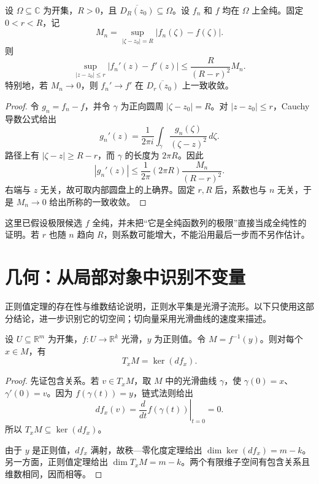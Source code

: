 \documentclass[11pt,a4paper,fontset=fandol,scheme=plain]{ctexart}
\begin{document}
\begin{proposition}[从边界误差到内部导数]\label{thm:cauchy-transfer}

设 $\Omega\subseteq\mathbb C$ 为开集，$R>0$，且 $\overline{D_R(z_0)}\subseteq\Omega$。设 $f_n$ 和 $f$ 均在 $\Omega$ 上全纯。固定 $0<r<R$，记
\[
M_n=\sup_{|\zeta-z_0|=R}|f_n(\zeta)-f(\zeta)|.
\]
则
\[
\sup_{|z-z_0|\le r}|f_n'(z)-f'(z)|
\le \frac{R}{(R-r)^2}M_n.
\]
特别地，若 $M_n\to0$，则 $f_n'\to f'$ 在 $\overline{D_r(z_0)}$ 上一致收敛。

\end{proposition}

\begin{proof}

令 $g_n=f_n-f$，并令 $\gamma$ 为正向圆周 $|\zeta-z_0|=R$。对 $|z-z_0|\le r$，Cauchy 导数公式给出
\[
g_n'(z)=\frac{1}{2\pi i}\int_\gamma
\frac{g_n(\zeta)}{(\zeta-z)^2}\,d\zeta.
\]
路径上有 $|\zeta-z|\ge R-r$，而 $\gamma$ 的长度为 $2\pi R$。因此
\[
|g_n'(z)|\le \frac{1}{2\pi}(2\pi R)
\frac{M_n}{(R-r)^2}.
\]
右端与 $z$ 无关，故可取内部圆盘上的上确界。固定 $r,R$ 后，系数也与 $n$ 无关，于是 $M_n\to0$ 给出所称的一致收敛。
\end{proof}

这里已假设极限候选 $f$ 全纯，并未把“它是全纯函数列的极限”直接当成全纯性的证明。若 $r$ 也随 $n$ 趋向 $R$，则系数可能增大，不能沿用最后一步而不另作估计。

\clearpage
\section{几何：从局部对象中识别不变量}

正则值定理的存在性与维数结论说明，正则水平集是光滑子流形。以下只使用这部分结论，进一步识别它的切空间；切向量采用光滑曲线的速度来描述。

\begin{proposition}[正则水平集的切空间]\label{thm:regular-level-tangent}

设 $U\subseteq\mathbb R^m$ 为开集，$f\colon U\to\mathbb R^k$ 光滑，$y$ 为正则值。令 $M=f^{-1}(y)$。则对每个 $x\in M$，有
\[
T_xM=\ker(df_x).
\]

\end{proposition}

\begin{proof}

先证包含关系。若 $v\in T_xM$，取 $M$ 中的光滑曲线 $\gamma$，使 $\gamma(0)=x$、$\gamma'(0)=v$。因为 $f(\gamma(t))=y$，链式法则给出
\[
df_x(v)=\left.\frac{d}{dt}f(\gamma(t))\right|_{t=0}=0.
\]
所以 $T_xM\subseteq\ker(df_x)$。

由于 $y$ 是正则值，$df_x$ 满射，故秩—零化度定理给出 $\dim\ker(df_x)=m-k$。另一方面，正则值定理给出 $\dim T_xM=m-k$。两个有限维子空间有包含关系且维数相同，因而相等。
\end{proof}
\end{document}
